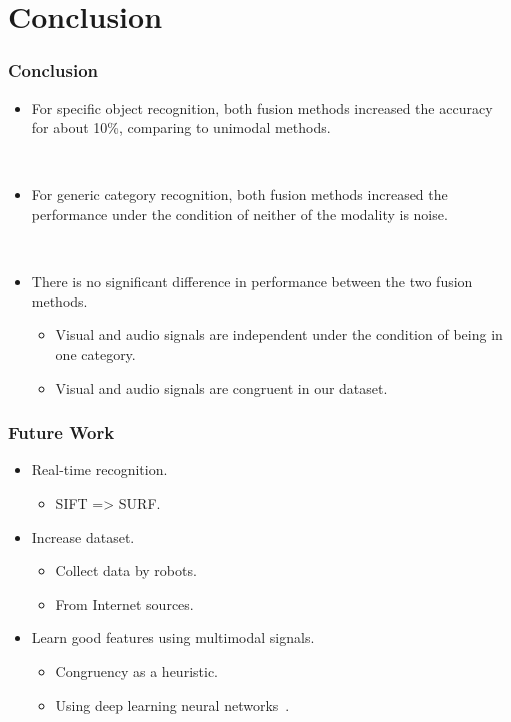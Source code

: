 \documentclass{beamer}
\begin{document}
  \section{Conclusion}
  \begin{frame}
    \frametitle{Conclusion}

    \begin{itemize}
      \item For specific object recognition, both fusion methods increased the accuracy for about 10\%, comparing to unimodal methods.

        ~
      \item For generic category recognition, both fusion methods increased the performance under the condition of neither of the modality is noise.

        ~
      \item There is no significant difference in performance between the two fusion methods.
         \begin{itemize}
           \item Visual and audio signals are independent under the condition of being in one category.
           \item Visual and audio signals are congruent in our dataset.
         \end{itemize}
    \end{itemize}
  \end{frame}

  \begin{frame}
    \frametitle{Future Work}

    \begin{itemize}
      \item Real-time recognition.
        \begin{itemize}
          \item SIFT => SURF.
        \end{itemize}

      \item Increase dataset.
        \begin{itemize}
          \item Collect data by robots.
          \item From Internet sources.
        \end{itemize}

      \item Learn good features using multimodal signals.
        \begin{itemize}
          \item Congruency as a heuristic.
          \item Using deep learning neural networks~\cite{ngiam_multimodal_2011}.
        \end{itemize}
    \end{itemize}
  \end{frame}
\end{document}
